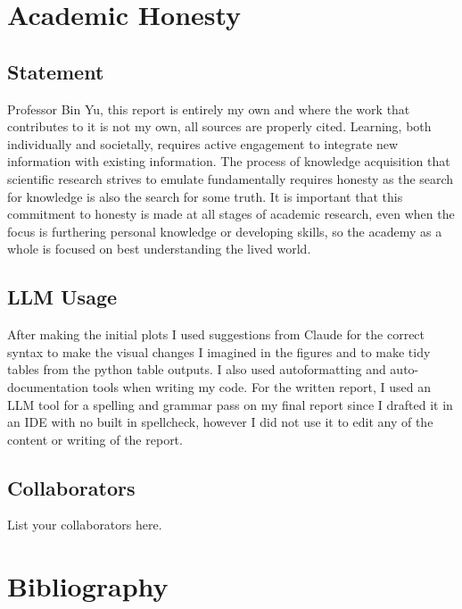 \documentclass[10pt,letterpaper]{article}
\begin{document}
\section{Academic Honesty}\label{academic-integrity-statement}
\subsection{Statement}

Professor Bin Yu, this report is entirely my own and where the work that contributes to it is not my own,
all sources are properly cited. Learning, both individually and societally, requires active engagement
to integrate new information with existing information. The process of knowledge acquisition that scientific
research strives to emulate fundamentally requires honesty as the search for knowledge is also the search
for some truth. It is important that this commitment to honesty is made at all stages of academic research,
even when the focus is furthering personal knowledge or developing skills, so the academy as a whole is
focused on best understanding the lived world.

\subsection{LLM Usage}

After making the initial plots I used suggestions from Claude for the correct syntax to make the visual changes I imagined in the figures and to make tidy tables from the python table outputs. I also used autoformatting and auto-documentation tools when writing my code. For the written report, I  used an LLM tool for a spelling and grammar pass on my final report since I drafted it in an IDE with no built in spellcheck, however I did not use it to edit any of the content or writing of the report. 

\subsection{Collaborators}
List your collaborators here.
\section{Bibliography}



\end{document}
